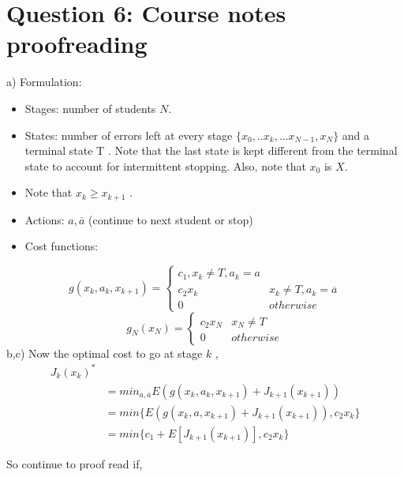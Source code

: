 \documentclass[12pt]{article}
\begin{document}
\section{Question 6: Course notes proofreading}

a) Formulation:

\begin{itemize}
\item  Stages: number of students $N$.
\item States: number of errors left at every stage $\{x_0,..x_k,...x_{N-1},x_{N}\}$ and a terminal state T . Note that the last state is kept different from the terminal state to account for intermittent stopping. Also, note that $x_0$ is $X$.
\item Note that $x_k \geqslant x_{k+1}$ .
\item Actions: $a, \overline{a}$ (continue to next student or stop)
\item Cost functions:
\end{itemize}

\[ g(x_k,a_k,x_{k+1}) = \begin{cases} 
          c_1,x_k \neq  T, a_k=a \\
           c_2x_k & x_k \neq  T, a_k=\overline{a}\\
          0 & otherwise
       \end{cases}
    \]
   \[ g_N(x_N) = \begin{cases} 
           c_2x_N & x_N \neq  T \\
          0 & otherwise
       \end{cases}
    \]
   b,c) Now the optimal cost to go at stage $k$ , \\
   
   \begin{align*}
J_k(x_k)^* \\
& = min_{a,\overline{a}}E( g(x_k,a_k,x_{k+1}) + J_{k+1}(x_{k+1})) \\
& = min \{ E( g(x_k,a,x_{k+1}) + J_{k+1}(x_{k+1}) ), c_2x_k \} \\
&= min \{ c_1 +E[ J_{k+1}(x_{k+1})], c_2x_k \}
\end{align*}

 So continue to proof read if,
 
\end{document}
